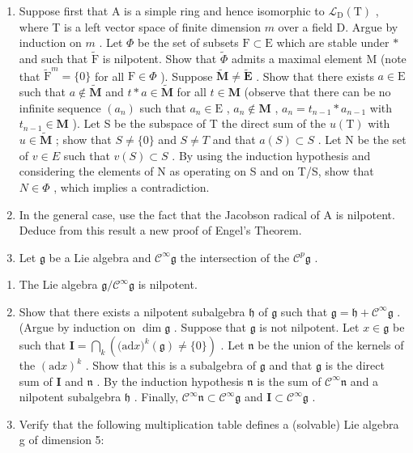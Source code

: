 \begin{enumerate}
\def\labelenumi{\arabic{enumi}.}
\item
  Suppose first that A is a simple ring and hence isomorphic to \(\mathcal{L}_{\mathrm{D}}(\mathrm{T})\) , where T is a left vector space of finite dimension \(m\) over a field D. Argue by induction on \(m\) . Let \(\Phi\) be the set of subsets \(\mathrm{F} \subset \mathrm{E}\) which are stable under \(*\) and such that \(\tilde{\mathrm{F}}\) is nilpotent. Show that \(\tilde{\Phi}\) admits a maximal element M (note that \(\tilde{\mathrm{F}}^m = \{0\}\) for all \(\mathrm{F} \in \Phi\) ). Suppose \(\tilde{\mathbf{M}} \neq \tilde{\mathbf{E}}\) . Show that there exists \(a \in \mathrm{E}\) such that \(a \notin \tilde{\mathbf{M}}\) and \(t * a \in \tilde{\mathbf{M}}\) for all \(t \in \mathbf{M}\) (observe that there can be no infinite sequence \((a_n)\) such that \(a_n \in \mathrm{E}\) , \(a_n \notin \mathbf{M}\) , \(a_n = t_{n-1} * a_{n-1}\) with \(t_{n-1} \in \mathbf{M}\) ). Let S be the subspace of T the direct sum of the \(u(\mathrm{T})\) with \(u \in \tilde{\mathbf{M}}\) ; show that \(S \neq \{0\}\) and \(S \neq T\) and that \(a(S) \subset S\) . Let N be the set of \(v \in E\) such that \(v(S) \subset S\) . By using the induction hypothesis and considering the elements of N as operating on S and on T/S, show that \(N \in \Phi\) , which implies a contradiction.
\item
  In the general case, use the fact that the Jacobson radical of A is nilpotent. Deduce from this result a new proof of Engel's Theorem.
\item
  Let \(\mathfrak{g}\) be a Lie algebra and \(\mathcal{C}^{\infty}\mathfrak{g}\) the intersection of the \(\mathcal{C}^p\mathfrak{g}\) .
\end{enumerate}

\begin{enumerate}
\def\labelenumi{(\alph{enumi})}
\item
  The Lie algebra \(\mathfrak{g} / \mathcal{C}^{\infty}\mathfrak{g}\) is nilpotent.
\item
  Show that there exists a nilpotent subalgebra \(\mathfrak{h}\) of \(\mathfrak{g}\) such that \(\mathfrak{g} = \mathfrak{h} + \mathcal{C}^{\infty}\mathfrak{g}\) . (Argue by induction on \(\dim \mathfrak{g}\) . Suppose that \(\mathfrak{g}\) is not nilpotent. Let \(x\in \mathfrak{g}\) be such that \(\mathbf{I} = \bigcap_{k}\left(\mathrm{(ad}x)^{k}(\mathfrak{g})\neq \{0\}\right)\) . Let \(\mathfrak{n}\) be the union of the kernels of the \((\mathrm{ad}x)^k\) . Show that this is a subalgebra of \(\mathfrak{g}\) and that \(\mathfrak{g}\) is the direct sum of \(\mathbf{I}\) and \(\mathfrak{n}\) . By the induction hypothesis \(\mathfrak{n}\) is the sum of \(\mathcal{C}^{\infty}\mathfrak{n}\) and a nilpotent subalgebra \(\mathfrak{h}\) . Finally, \(\mathcal{C}^{\infty}\mathfrak{n}\subset \mathcal{C}^{\infty}\mathfrak{g}\) and \(\mathbf{I}\subset \mathcal{C}^{\infty}\mathfrak{g}\) .
\item
  Verify that the following multiplication table defines a (solvable) Lie algebra g of dimension 5:
\end{enumerate}

